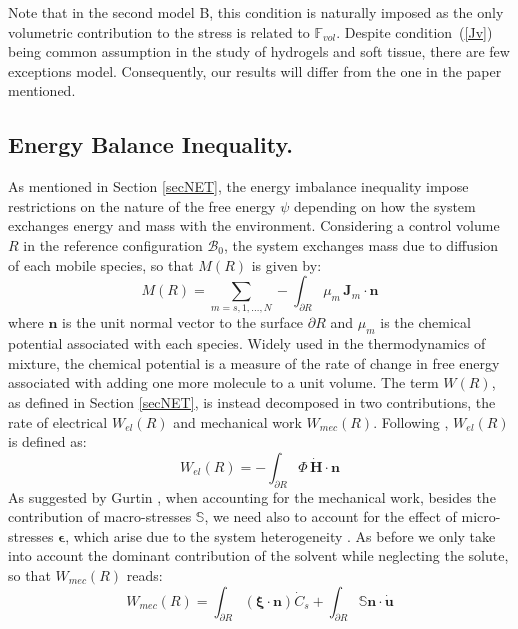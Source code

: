 \documentclass[runningheads]{llncs}
\newcommand{\F}{\ensuremath{\mathbb{F}}}
\begin{document}
Note that in the second model B, this condition is naturally imposed as the only volumetric contribution to the stress is related to $\F_{vol}$.
Despite condition~(\ref{Jv}) being common assumption in the study of hydrogels and soft tissue, there are few exceptions \cite{Article1,CACCAVO2,wang} model. Consequently, our results will differ from the one in the paper mentioned. 
 
\subsection{Energy Balance Inequality.}
As mentioned in Section \ref{secNET}, the energy imbalance inequality impose restrictions on the nature of the free energy $\psi$ depending on  how the system exchanges energy and mass with the environment. Considering a control volume $R$ in the reference configuration $\mathcal{B}_0$, the system exchanges mass due to diffusion of each mobile species, so that $M(R)$ is given by:
\begin{equation}
M(R)= \sum\limits_{m=s,1,\ldots,N} - \int_{\partial R} \mu_m \,\mathbf{J}_m \cdot \mathbf{n} 
\end{equation}
where $\mathbf{n}$ is the unit normal vector to the surface $\partial R$ and $\mu_m$ is the chemical potential associated with each species. Widely used in the thermodynamics of mixture, the chemical potential is a measure of the rate of change in free energy associated with adding one more molecule to a unit volume. The term $W(R)$, as defined in Section \ref{secNET}, is instead decomposed in two contributions, the rate of electrical $W_{el}(R)$ and mechanical work $W_{mec}(R)$. Following \cite{DROZDOVph}, $W_{el}(R)$ is defined as:
\begin{equation}
W_{el}(R) = -\int_{\partial R} \Phi\, \dot{\mathbf{H}}\cdot \mathbf{n}
\end{equation}
As suggested by Gurtin \cite{GURTIN}, when accounting for the mechanical work, besides the contribution of macro-stresses $\mathbb{S}$, we need also to account for the effect of micro-stresses $\boldsymbol{\epsilon}$, which arise due to the system heterogeneity \cite{microstress}. As before we only take into account the dominant contribution of the solvent while neglecting the solute, so that $W_{mec}(R)$ reads:
\begin{equation}
W_{mec}(R) = \int_{\partial R} \left(\boldsymbol{\xi}\cdot \mathbf{n}\right)\dot{C}_s + \int_{\partial R} \mathbb{S}\mathbf{n} \cdot \dot{\mathbf{u}}
\end{equation}
\end{document}

